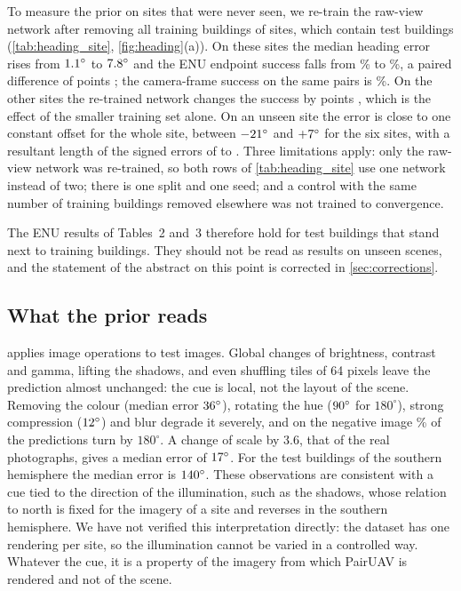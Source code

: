 To measure the prior on sites that were never seen, we re-train the raw-view network after removing all \hdSdRemoved{} training buildings of \hdSdSites{} sites, which contain \hdSdBuildings{} test buildings (\cref{tab:heading_site}, \cref{fig:heading}(a)). On these sites the median heading error rises from $1.1^\circ$ to $7.8^\circ$ and the ENU endpoint success falls from \hdSdSeenSRe\% to \hdSdUnseenSRe\%, a paired difference of \hdSdDelta{} points \ci{\hdSdDeltaLo}{\hdSdDeltaHi}; the camera-frame success on the same pairs is \hdSdCamSRe\%. On the other sites the re-trained network changes the success by \hdSdOtherDelta{} points \ci{\hdSdOtherDeltaLo}{\hdSdOtherDeltaHi}, which is the effect of the smaller training set alone. On an unseen site the error is close to one constant offset for the whole site, between $-21^\circ$ and $+7^\circ$ for the six sites, with a resultant length of the signed errors of \hdSdResLo{} to \hdSdResHi. Three limitations apply: only the raw-view network was re-trained, so both rows of \cref{tab:heading_site} use one network instead of two; there is one split and one seed; and a control with the same number of training buildings removed elsewhere was not trained to convergence.

The ENU results of Tables~2 and~3 therefore hold for test buildings that stand next to training buildings. They should not be read as results on unseen scenes, and the statement of the abstract on this point is corrected in \cref{sec:corrections}.



\subsection{What the prior reads}
\label{sec:headsens}

 applies image operations to \hdSensN{} test images. Global changes of brightness, contrast and gamma, lifting the shadows, and even shuffling tiles of 64 pixels leave the prediction almost unchanged: the cue is local, not the layout of the scene. Removing the colour (median error $36^\circ$), rotating the hue ($90^\circ$ for $180^\circ$), strong compression ($12^\circ$) and blur degrade it severely, and on the negative image \hdSensNegFlip\% of the predictions turn by $180^\circ$. A change of scale by 3.6, that of the real photographs, gives a median error of $17^\circ$. For the \hdSouthN{} test buildings of the southern hemisphere the median error is $140^\circ$. These observations are consistent with a cue tied to the direction of the illumination, such as the shadows, whose relation to north is fixed for the imagery of a site and reverses in the southern hemisphere. We have not verified this interpretation directly: the dataset has one rendering per site, so the illumination cannot be varied in a controlled way. Whatever the cue, it is a property of the imagery from which PairUAV is rendered and not of the scene.

